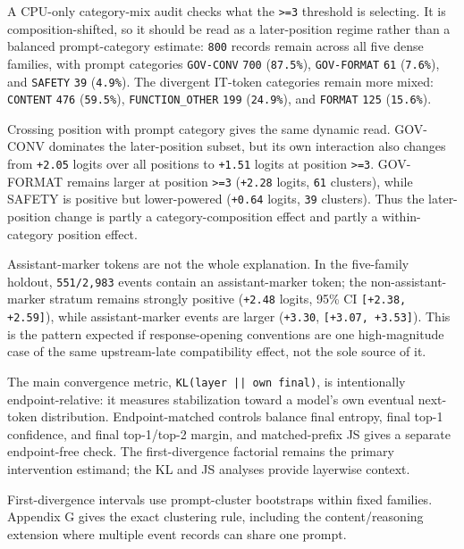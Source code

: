 \documentclass[11pt]{article}
\begin{document}
A CPU-only category-mix audit checks what the \texttt{>=3} threshold is selecting. It is composition-shifted, so it should be read as a later-position regime rather than a balanced prompt-category estimate: \texttt{800} records remain across all five dense families, with prompt categories \texttt{GOV-CONV} \texttt{700} (\texttt{87.5\%}), \texttt{GOV-FORMAT} \texttt{61} (\texttt{7.6\%}), and \texttt{SAFETY} \texttt{39} (\texttt{4.9\%}). The divergent IT-token categories remain more mixed: \texttt{CONTENT} \texttt{476} (\texttt{59.5\%}), \texttt{FUNCTION\_OTHER} \texttt{199} (\texttt{24.9\%}), and \texttt{FORMAT} \texttt{125} (\texttt{15.6\%}).

Crossing position with prompt category gives the same dynamic read. GOV-CONV dominates the later-position subset, but its own interaction also changes from \texttt{+2.05} logits over all positions to \texttt{+1.51} logits at position \texttt{>=3}. GOV-FORMAT remains larger at position \texttt{>=3} (\texttt{+2.28} logits, \texttt{61} clusters), while SAFETY is positive but lower-powered (\texttt{+0.64} logits, \texttt{39} clusters). Thus the later-position change is partly a category-composition effect and partly a within-category position effect.

Assistant-marker tokens are not the whole explanation. In the five-family holdout, \texttt{551/2,983} events contain an assistant-marker token; the non-assistant-marker stratum remains strongly positive (\texttt{+2.48} logits, 95\% CI \texttt{[+2.38, +2.59]}), while assistant-marker events are larger (\texttt{+3.30}, \texttt{[+3.07, +3.53]}). This is the pattern expected if response-opening conventions are one high-magnitude case of the same upstream-late compatibility effect, not the sole source of it.

The main convergence metric, \texttt{KL(layer || own final)}, is intentionally endpoint-relative: it measures stabilization toward a model's own eventual next-token distribution. Endpoint-matched controls balance final entropy, final top-1 confidence, and final top-1/top-2 margin, and matched-prefix JS gives a separate endpoint-free check. The first-divergence factorial remains the primary intervention estimand; the KL and JS analyses provide layerwise context.

First-divergence intervals use prompt-cluster bootstraps within fixed families. Appendix G gives the exact clustering rule, including the content/reasoning extension where multiple event records can share one prompt.
\end{document}
